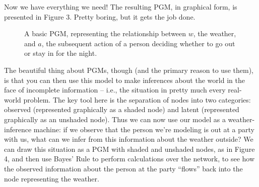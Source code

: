 Now we have everything we need! The resulting PGM, in graphical form, is presented in Figure 3. Pretty boring, but it gets the job done.


\begin{figure}[!ht]
  \centering
  \label{fig:pgm-noshade}
  \caption{A basic PGM, representing the relationship between $w$, the weather, and $a$, the subsequent action of a person deciding whether to go out or stay in for the night.}
\end{figure}

The beautiful thing about PGMs, though (and the primary reason to use them), is that you can then use this model to make inferences about the world in the face of incomplete information -- i.e., the situation in pretty much every real-world problem. The key tool here is the separation of nodes into two categories: observed (represented graphically as a shaded node) and latent (represented graphically as an unshaded node). Thus we can now use our model as a weather-inference machine: if we observe that the person we’re modeling is out at a party with us, what can we infer from this information about the weather outside? We can draw this situation as a PGM with shaded and unshaded nodes, as in Figure 4, and then use Bayes’ Rule to perform calculations over the network, to see how the observed information about the person at the party “flows” back into the node representing the weather.

